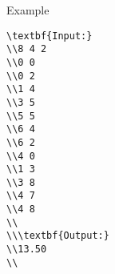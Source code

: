 Example
\begin{verbatim}
\textbf{Input:}
\\8 4 2
\\0 0
\\0 2
\\1 4
\\3 5
\\5 5
\\6 4
\\6 2
\\4 0
\\1 3
\\3 8
\\4 7
\\4 8
\\
\\\textbf{Output:}
\\13.50
\\\end{verbatim}